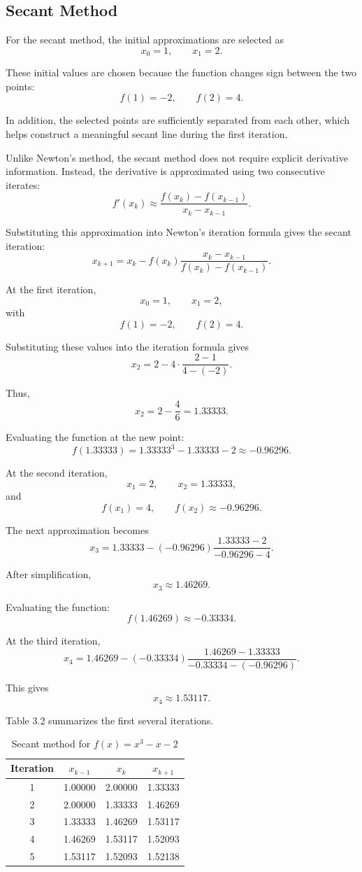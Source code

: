 \subsection{Secant Method}

For the secant method, the initial approximations are selected as
\[
x_0=1,
\qquad
x_1=2.
\]

These initial values are chosen because the function changes sign between the two points:
\[
f(1)=-2,
\qquad
f(2)=4.
\]

In addition, the selected points are sufficiently separated from each other, which helps construct a meaningful secant line during the first iteration.

Unlike Newton's method, the secant method does not require explicit derivative information. Instead, the derivative is approximated using two consecutive iterates:
\[
f'(x_k)
\approx
\frac{f(x_k)-f(x_{k-1})}{x_k-x_{k-1}}.
\]

Substituting this approximation into Newton's iteration formula gives the secant iteration:
\[
x_{k+1}
=
x_k
-
f(x_k)
\frac{x_k-x_{k-1}}
{
f(x_k)-f(x_{k-1})
}.
\]

At the first iteration,
\[
x_0=1,
\qquad
x_1=2,
\]
with
\[
f(1)=-2,
\qquad
f(2)=4.
\]

Substituting these values into the iteration formula gives
\[
x_2
=
2
-
4
\cdot
\frac{2-1}{4-(-2)}.
\]

Thus,
\[
x_2
=
2-\frac{4}{6}
=
1.33333.
\]

Evaluating the function at the new point:
\[
f(1.33333)
=
1.33333^3-1.33333-2
\approx
-0.96296.
\]

At the second iteration,
\[
x_1=2,
\qquad
x_2=1.33333,
\]
and
\[
f(x_1)=4,
\qquad
f(x_2)\approx -0.96296.
\]

The next approximation becomes
\[
x_3
=
1.33333
-
(-0.96296)
\frac{1.33333-2}
{-0.96296-4}.
\]

After simplification,
\[
x_3
\approx
1.46269.
\]

Evaluating the function:
\[
f(1.46269)
\approx
-0.33334.
\]

At the third iteration,
\[
x_4
=
1.46269
-
(-0.33334)
\frac{1.46269-1.33333}
{-0.33334-(-0.96296)}.
\]

This gives
\[
x_4
\approx
1.53117.
\]

Table 3.2 summarizes the first several iterations.

\begin{table}[h!]
\centering
\caption{Secant method for \(f(x)=x^3-x-2\)}
\label{tab:secant_example}
\begin{tabular}{|c|c|c|c|}
\hline
Iteration & \(x_{k-1}\) & \(x_k\) & \(x_{k+1}\) \\ \hline
1 & 1.00000 & 2.00000 & 1.33333 \\ \hline
2 & 2.00000 & 1.33333 & 1.46269 \\ \hline
3 & 1.33333 & 1.46269 & 1.53117 \\ \hline
4 & 1.46269 & 1.53117 & 1.52093 \\ \hline
5 & 1.53117 & 1.52093 & 1.52138 \\ \hline
\end{tabular}
\end{table}

